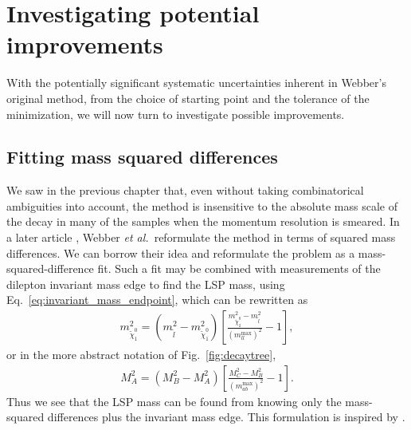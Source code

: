 \documentclass[twoside,english]{uiofysmaster}
\begin{document}
\chapter{Investigating potential improvements}%
\label{ch:investigating_improvements}
With the potentially significant systematic uncertainties inherent in Webber's original method, from the choice of starting point and the tolerance of the minimization, we will now turn to investigate possible improvements.


\section{Fitting mass squared differences}
We saw in the previous chapter that, even without taking combinatorical ambiguities into account, the method is insensitive to the absolute mass scale of the decay in many of the samples when the momentum resolution is smeared. In a later article \cite{Nojiri:2010dk}, Webber {\it et al.}\ reformulate the method in terms of squared mass differences. We can borrow their idea and reformulate the problem as a mass-squared-difference fit. Such a fit may be combined with measurements of the dilepton invariant mass edge to find the LSP mass, using Eq.\ \eqref{eq:invariant_mass_endpoint}, which can be rewritten as
\begin{align}
	m^2_{\tilde\chi_1^0} = (m^2_{\tilde l} - m^2_{\tilde \chi_1^0})\left[\frac{m^2_{\tilde\chi_2^0} - m^2_{\tilde l}}{(m_{ll}^\mathrm{max})^2} - 1\right],
\end{align}
or in the more abstract notation of Fig.\ \ref{fig:decaytree},
\begin{align}
	M^2_A = (M^2_B - M^2_A)\left[\frac{M^2_C - M^2_B}{(m_{ab}^\mathrm{max})^2} - 1\right].\label{eq:MLSP_dilepton_edge}
\end{align}
Thus we see that the LSP mass can be found from knowing only the mass-squared differences plus the invariant mass edge. This formulation is inspired by \cite{Cheng:2009fw}.
\end{document}
